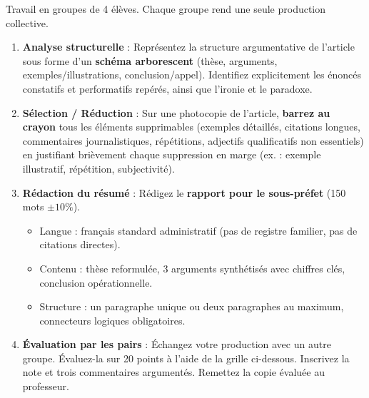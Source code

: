 \documentclass[11pt]{article}
\newcounter{popsec}
\newcounter{popsub}
\newcommand{\courssub}[1]{%
  \stepcounter{popsub}%
  \par\vspace{9pt}\noindent{\popxbold\fontsize{11.5}{13}\selectfont\color{popink}{\color{poporange}\thepopsec.\thepopsub}\hspace{6pt}#1}\par\nopagebreak\vspace{4pt}
}
\begin{document}
\courssub{Consignes}
Travail en groupes de 4 élèves. Chaque groupe rend une seule production collective.

\begin{enumerate}
    \item \textbf{Analyse structurelle} : Représentez la structure argumentative de l'article sous forme d'un \textbf{schéma arborescent} (thèse, arguments, exemples/illustrations, conclusion/appel). Identifiez explicitement les énoncés constatifs et performatifs repérés, ainsi que l'ironie et le paradoxe.
    \item \textbf{Sélection / Réduction} : Sur une photocopie de l'article, \textbf{barrez au crayon} tous les éléments supprimables (exemples détaillés, citations longues, commentaires journalistiques, répétitions, adjectifs qualificatifs non essentiels) en justifiant brièvement chaque suppression en marge (ex. : \og{}exemple illustratif\fg{}, \og{}répétition\fg{}, \og{}subjectivité\fg{}).
    \item \textbf{Rédaction du résumé} : Rédigez le \textbf{rapport pour le sous-préfet} (150 mots $\pm 10\%$).
        \begin{itemize}
            \item Langue : français standard administratif (pas de registre familier, pas de citations directes).
            \item Contenu : thèse reformulée, 3 arguments synthétisés avec chiffres clés, conclusion opérationnelle.
            \item Structure : un paragraphe unique ou deux paragraphes au maximum, connecteurs logiques obligatoires.
        \end{itemize}
    \item \textbf{Évaluation par les pairs} : Échangez votre production avec un autre groupe. Évaluez-la sur 20 points à l'aide de la grille ci-dessous. Inscrivez la note et trois commentaires argumentés. Remettez la copie évaluée au professeur.
\end{enumerate}
\end{document}
